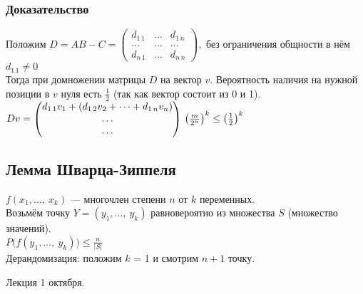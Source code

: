 \documentclass[12pt, a4paper]{article}
\begin{document}
    \subsubsection*{Доказательство}
    Положим $D = AB - C = \begin{pmatrix}
        d_{1\, 1} & \dots & d_{1\, n}\\
        \dots & \dots & \dots\\
        d_{n\, 1} & \dots & d_{n\, n}
    \end{pmatrix},$ без ограничения общности в нём $d_{1\, 1} \neq 0$\\
    Тогда при домножении матрицы $D$ на вектор $v$. Вероятность наличия на нужной позиции в $v$ нуля есть $\frac{1}{2}$ (так как вектор состоит из 0 и 1).
    $Dv = \begin{pmatrix}
        d_{1\, 1} v_1 + (d_{1\, 2} v_2 + \dots + d_{1\, n} v_n)\\
        \dots\\
        \dots
    \end{pmatrix}\\
    \left( \frac{m}{2^n} \right)^k \leq \left( \frac{1}{2} \right)^k$
    \subsection*{Лемма Шварца-Зиппеля}
    $f(x_1,\dots,\ x_k)$ --- многочлен степени $n$ от $k$ переменных.\\
    Возьмём точку $Y = (y_1,\dots,\ y_k)$ равновероятно из множества $S$ (множество значений).\\
    $P\big(f(y_1,\dots,\ y_k)\big) \leq \frac{n}{|S|}$\\
    Дерандомизация: положим $k$ = 1 и смотрим $n + 1$ точку.
    \begin{center}
        Лекция 1 октября.
    \end{center}
\end{document}
